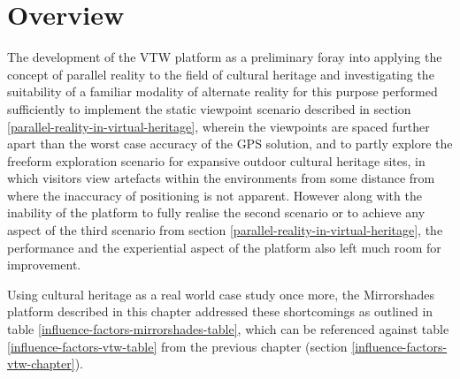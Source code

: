 




\section{Overview}
The development of the VTW platform as a preliminary foray into applying the concept of parallel reality to the field of cultural heritage and investigating the suitability of a familiar modality of alternate reality for  this purpose performed sufficiently to implement the static viewpoint scenario described in section \ref{parallel-reality-in-virtual-heritage}, wherein the viewpoints are spaced further apart than the worst case accuracy of the GPS solution, and to partly explore the freeform exploration scenario for expansive outdoor cultural heritage sites, in which visitors view artefacts within the environments from some distance from where the inaccuracy of positioning is not apparent. However along with the inability of the platform to fully realise the second scenario or to achieve any aspect of the third scenario from section \ref{parallel-reality-in-virtual-heritage}, the performance and the experiential aspect of the platform also left much room for improvement.

Using cultural heritage as a real world case study once more, the Mirrorshades platform described in this chapter addressed these shortcomings as outlined in table \ref{influence-factors-mirrorshades-table}, which can be referenced against table \ref{influence-factors-vtw-table} from the previous chapter (section \ref{influence-factors-vtw-chapter}).

